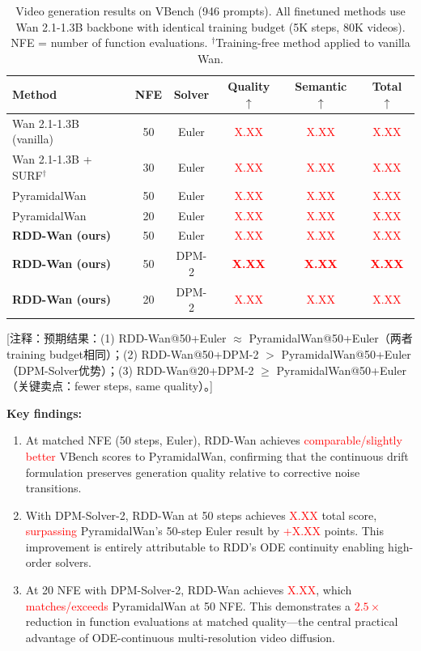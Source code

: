 \begin{table}[t]
\centering
\caption{Video generation results on VBench (946 prompts). All finetuned methods use Wan 2.1-1.3B backbone with identical training budget (5K steps, 80K videos). NFE = number of function evaluations. $^\dagger$Training-free method applied to vanilla Wan.}
\label{tab:video_main}
\small
\begin{tabular}{@{}lccccc@{}}
\toprule
\textbf{Method} & \textbf{NFE} & \textbf{Solver} & \textbf{Quality} $\uparrow$ & \textbf{Semantic} $\uparrow$ & \textbf{Total} $\uparrow$ \\
\midrule
Wan 2.1-1.3B (vanilla) & 50 & Euler & \textcolor{red}{X.XX} & \textcolor{red}{X.XX} & \textcolor{red}{X.XX} \\
Wan 2.1-1.3B + SURF$^\dagger$ & 30 & Euler & \textcolor{red}{X.XX} & \textcolor{red}{X.XX} & \textcolor{red}{X.XX} \\
\midrule
PyramidalWan & 50 & Euler & \textcolor{red}{X.XX} & \textcolor{red}{X.XX} & \textcolor{red}{X.XX} \\
PyramidalWan & 20 & Euler & \textcolor{red}{X.XX} & \textcolor{red}{X.XX} & \textcolor{red}{X.XX} \\
\midrule
\textbf{RDD-Wan (ours)} & 50 & Euler & \textcolor{red}{X.XX} & \textcolor{red}{X.XX} & \textcolor{red}{X.XX} \\
\textbf{RDD-Wan (ours)} & 50 & DPM-2 & \textcolor{red}{\textbf{X.XX}} & \textcolor{red}{\textbf{X.XX}} & \textcolor{red}{\textbf{X.XX}} \\
\textbf{RDD-Wan (ours)} & 20 & DPM-2 & \textcolor{red}{X.XX} & \textcolor{red}{X.XX} & \textcolor{red}{X.XX} \\
\bottomrule
\end{tabular}
\end{table}

\textcolor{green!50!black}{[注释：预期结果：(1) RDD-Wan@50+Euler $\approx$ PyramidalWan@50+Euler（两者training budget相同）；(2) RDD-Wan@50+DPM-2 $>$ PyramidalWan@50+Euler（DPM-Solver优势）；(3) RDD-Wan@20+DPM-2 $\geq$ PyramidalWan@50+Euler（关键卖点：fewer steps, same quality）。]}

\textbf{Key findings:}
\begin{enumerate}
    \item At matched NFE (50 steps, Euler), RDD-Wan achieves \textcolor{red}{comparable/slightly better} VBench scores to PyramidalWan, confirming that the continuous drift formulation preserves generation quality relative to corrective noise transitions.
    \item With DPM-Solver-2, RDD-Wan at 50 steps achieves \textcolor{red}{X.XX} total score, \textcolor{red}{surpassing} PyramidalWan's 50-step Euler result by \textcolor{red}{+X.XX} points. This improvement is entirely attributable to RDD's ODE continuity enabling high-order solvers.
    \item At 20 NFE with DPM-Solver-2, RDD-Wan achieves \textcolor{red}{X.XX}, which \textcolor{red}{matches/exceeds} PyramidalWan at 50 NFE. This demonstrates a \textcolor{red}{$2.5\times$} reduction in function evaluations at matched quality---the central practical advantage of ODE-continuous multi-resolution video diffusion.
\end{enumerate}

